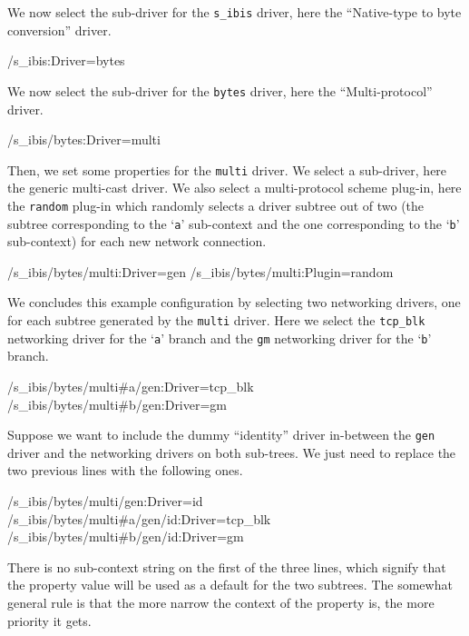 \documentclass[11pt]{book}
\begin{document}
We now select the sub-driver for the \texttt{s\_ibis} driver, here the
``Native-type to byte conversion'' driver.
\begin{Miniverb}

  /s_ibis:Driver=bytes

\end{Miniverb}

We now select the sub-driver for the \texttt{bytes} driver, here the
``Multi-protocol'' driver.
\begin{Miniverb}

  /s_ibis/bytes:Driver=multi

\end{Miniverb}

Then, we set some properties for the \texttt{multi} driver. We select
a sub-driver, here the generic multi-cast driver. We also select a
multi-protocol scheme plug-in, here the \texttt{random} plug-in which
randomly selects a driver subtree out of two (the subtree corresponding
to the `\texttt{a}' sub-context and the one corresponding to the
`\texttt{b}' sub-context) for each new network connection.
\begin{Miniverb}

  /s_ibis/bytes/multi:Driver=gen
  /s_ibis/bytes/multi:Plugin=random

\end{Miniverb}

We concludes this example configuration by selecting two networking
drivers, one for each subtree generated by the \texttt{multi} driver.
Here we select the \texttt{tcp\_blk} networking driver for the
`\texttt{a}' branch and the \texttt{gm} networking driver for the
`\texttt{b}' branch.
\begin{Miniverb}

  /s_ibis/bytes/multi#a/gen:Driver=tcp_blk
  /s_ibis/bytes/multi#b/gen:Driver=gm

\end{Miniverb}

Suppose we want to include the dummy ``identity'' driver in-between
the \texttt{gen} driver and the networking drivers on both sub-trees.
We just need to replace the two previous lines with the following
ones.
\begin{Miniverb}

  /s_ibis/bytes/multi/gen:Driver=id
  /s_ibis/bytes/multi#a/gen/id:Driver=tcp_blk
  /s_ibis/bytes/multi#b/gen/id:Driver=gm

\end{Miniverb}
There is no sub-context string on the first of the three lines, which
signify that the property value will be used as a default for the two
subtrees. The somewhat general rule is that the more narrow the
context of the property is, the more priority it gets.
\end{document}
